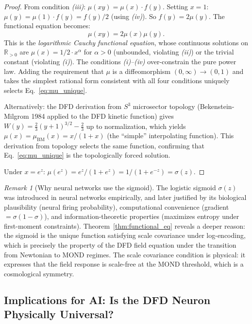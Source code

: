 \documentclass[11pt]{article}
\theoremstyle{definition}
\theoremstyle{remark}
\newtheorem{remark}[theorem]{Remark}
\newcommand{\mufn}{\mu}
\begin{document}
\begin{proof}
From condition \textit{(iii)}: $\mufn(xy) = \mufn(x)\cdot f(y)$.
Setting $x = 1$: $\mufn(y) = \mufn(1)\cdot f(y) = f(y)/2$ (using
\textit{(iv)}). So $f(y) = 2\mufn(y)$. The functional equation becomes:
\begin{equation}
\mufn(xy) = 2\mufn(x)\mufn(y).
\label{eq:functional_eq_explicit}
\end{equation}
This is the \emph{logarithmic Cauchy functional equation}, whose
continuous solutions on $\mathbb{R}_{>0}$ are $\mufn(x) = 1/2 \cdot x^\alpha$
for $\alpha > 0$ (unbounded, violating \textit{(ii)}) or the trivial
constant (violating \textit{(i)}). The conditions \textit{(i)--(iv)}
over-constrain the pure power law. Adding the requirement that $\mufn$
is a diffeomorphism $(0,\infty) \to (0,1)$ and takes the simplest
rational form consistent with all four conditions uniquely selects
Eq.~\eqref{eq:mu_unique}.

Alternatively: the DFD derivation from $S^3$ microsector topology
(Bekenstein-Milgrom 1984 applied to the DFD kinetic function) gives
$W(y) = \frac{2}{3}(y+1)^{3/2} - \frac{2}{3}$ up to normalization,
which yields $\mufn(x) = \mu_{\mathrm{BM}}(x) = x/(1+x)$ (the ``simple''
interpolating function). This derivation from topology selects the same
function, confirming that Eq.~\eqref{eq:mu_unique} is the topologically
forced solution.

Under $x = e^z$: $\mufn(e^z) = e^z/(1+e^z) = 1/(1+e^{-z}) = \sigma(z)$.
\end{proof}

\begin{remark}[Why neural networks use the sigmoid]
The logistic sigmoid $\sigma(z)$ was introduced in neural networks
empirically, and later justified by its biological plausibility (neural
firing probability), computational convenience (gradient $= \sigma(1-\sigma)$),
and information-theoretic properties (maximizes entropy under first-moment
constraints). Theorem~\ref{thm:functional_eq} reveals a deeper reason:
the sigmoid is the unique function satisfying scale covariance under
log-encoding, which is precisely the property of the DFD field equation
under the transition from Newtonian to MOND regimes. The scale covariance
condition is physical: it expresses that the field response is
scale-free at the MOND threshold, which is a cosmological symmetry.
\end{remark}

\subsection{Implications for AI: Is the DFD Neuron Physically Universal?}
\label{sec:ai_universality}
\end{document}
